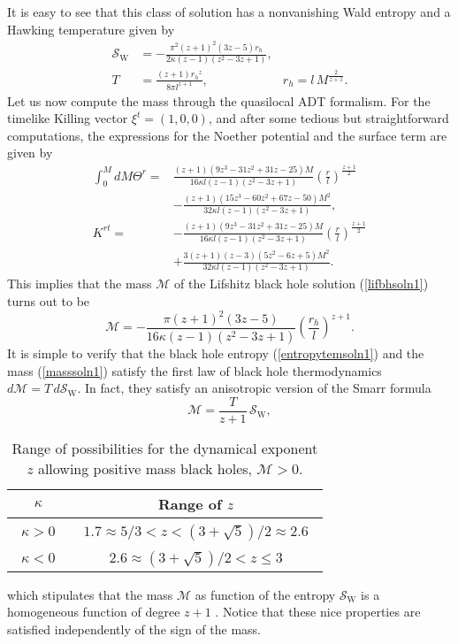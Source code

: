 \documentclass[prd,twocolumn,superscriptaddress,amsmath,amssymb,nofootinbib]{revtex4-1}
\begin{document}
It is easy to see that this class of solution has a
nonvanishing Wald entropy and a Hawking temperature given by
\begin{align}\label{entropytemsoln1}
\mathcal{S}_{\mathrm{W}}&=
-\frac{\pi^2(z+1)^2(3z-5)r_{h}}{2\kappa(z-1)(z^2-3z+1)},\\
T&=\frac{(z+1){r_h}^z}{8{\pi}l^{z+1}}, & r_h=l\,M^{\frac{2}{z+1}}.
\end{align}
Let us now compute the mass through the quasilocal ADT
formalism. For the timelike Killing vector $\xi^t=(1,0,0)$, and
after some tedious but straightforward computations, the
expressions for the Noether potential and the surface term are
given by {\small
\begin{align}
\int_{0}^{M}\!\!\!\!dM\Theta^{r}={}&
\frac{(z+1)(9z^3-31z^2+31z-25)M}{16{\kappa}l(z-1)(z^2-3z+1)}
\left(\frac{r}{l}\right)^{\frac{z+1}{2}}\nonumber\\
&-\frac{(z+1)(15z^3-60z^2+67z-50)M^2}{32{\kappa}l(z-1)(z^2-3z+1)},
\nonumber\\
K^{rt}={}&-\frac{(z+1)(9z^3-31z^2+31z-25)M}{16{\kappa}l(z-1)(z^2-3z+1)}
\left(\frac{r}{l}\right)^{\frac{z+1}{2}}\nonumber\\
&+\frac{3(z+1)(z-3)(5z^2-6z+5)M^2}{32{\kappa}l(z-1)(z^2-3z+1)}.
\nonumber
\end{align}}%
This implies that the mass $\mathcal{M}$ of the Lifshitz black
hole solution (\ref{lifbhsoln1}) turns out to be
\begin{equation}\label{masssoln1}
\mathcal{M}=-\frac{\pi(z+1)^2(3z-5)}{16\kappa(z-1)(z^2-3z+1)}
\left(\frac{r_h}{l}\right)^{z+1}.
\end{equation}
It is simple to verify that the black hole entropy
(\ref{entropytemsoln1}) and the mass (\ref{masssoln1}) satisfy
the first law of black hole thermodynamics
$d\mathcal{M}=T\,d\mathcal{S}_{\mathrm{W}}$. In fact, they
satisfy an anisotropic version of the Smarr formula
\begin{equation}\label{Smarr}
\mathcal{M}=\frac{T}{z+1}\,\mathcal{S}_{\mathrm{W}},
\end{equation}%
\begin{table}%
\caption{\label{tabla1}Range of possibilities for the dynamical
exponent $z$ allowing positive mass black holes,
$\mathcal{M}>0$.}
\begin{tabular}{|c|c|}
\hline
$\kappa$ & Range of $z$ \\
\hline \hline
~$\kappa>0$~ & ~$1.7\approx5/3<z<{(3+\sqrt{5})}/{2}\approx2.6$~ \\  [1ex]
\hline \hline
~$\kappa<0$~ & ~$2.6\approx(3+\sqrt{5})/2<z\leq3$~ \\  [1ex]
\hline
\end{tabular}
\end{table}%
which stipulates that the mass $\mathcal{M}$ as function of the
entropy $\mathcal{S}_{\mathrm{W}}$ is a homogeneous function of
degree $z+1$ \cite{Smarr:1972kt}. Notice that these nice
properties are satisfied independently of the sign of the mass.
\end{document}
